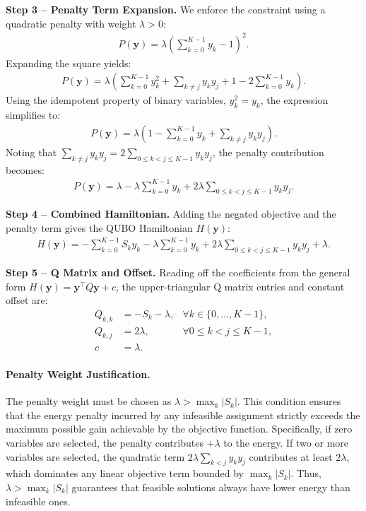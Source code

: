 \documentclass[12pt]{article}
\begin{document}
\textbf{Step 3 -- Penalty Term Expansion.} We enforce the constraint using a quadratic penalty with weight $\lambda > 0$:
\begin{align}
    P(\mathbf{y}) = \lambda \left( \sum_{k=0}^{K-1} y_k - 1 \right)^2.
\end{align}
Expanding the square yields:
\begin{align}
    P(\mathbf{y}) = \lambda \left( \sum_{k=0}^{K-1} y_k^2 + \sum_{k \neq j} y_k y_j + 1 - 2\sum_{k=0}^{K-1} y_k \right).
\end{align}
Using the idempotent property of binary variables, $y_k^2 = y_k$, the expression simplifies to:
\begin{align}
    P(\mathbf{y}) = \lambda \left( 1 - \sum_{k=0}^{K-1} y_k + \sum_{k \neq j} y_k y_j \right).
\end{align}
Noting that $\sum_{k \neq j} y_k y_j = 2 \sum_{0 \le k < j \le K-1} y_k y_j$, the penalty contribution becomes:
\begin{align}
    P(\mathbf{y}) = \lambda - \lambda \sum_{k=0}^{K-1} y_k + 2\lambda \sum_{0 \le k < j \le K-1} y_k y_j.
\end{align}

\textbf{Step 4 -- Combined Hamiltonian.} Adding the negated objective and the penalty term gives the QUBO Hamiltonian $H(\mathbf{y})$:
\begin{align}
    H(\mathbf{y}) = -\sum_{k=0}^{K-1} S_k y_k - \lambda \sum_{k=0}^{K-1} y_k + 2\lambda \sum_{0 \le k < j \le K-1} y_k y_j + \lambda.
\end{align}

\textbf{Step 5 -- Q Matrix and Offset.} Reading off the coefficients from the general form $H(\mathbf{y}) = \mathbf{y}^\top Q \mathbf{y} + c$, the upper-triangular Q matrix entries and constant offset are:
\begin{align}
    Q_{k,k} &= -S_k - \lambda, & \forall k \in \{0, \dots, K-1\}, \\
    Q_{k,j} &= 2\lambda, & \forall 0 \le k < j \le K-1, \\
    c &= \lambda.
\end{align}

\paragraph{Penalty Weight Justification.}
The penalty weight must be chosen as $\lambda > \max_{k} |S_k|$. This condition ensures that the energy penalty incurred by any infeasible assignment strictly exceeds the maximum possible gain achievable by the objective function. Specifically, if zero variables are selected, the penalty contributes $+\lambda$ to the energy. If two or more variables are selected, the quadratic term $2\lambda \sum_{k<j} y_k y_j$ contributes at least $2\lambda$, which dominates any linear objective term bounded by $\max_k |S_k|$. Thus, $\lambda > \max_k |S_k|$ guarantees that feasible solutions always have lower energy than infeasible ones.
\end{document}

